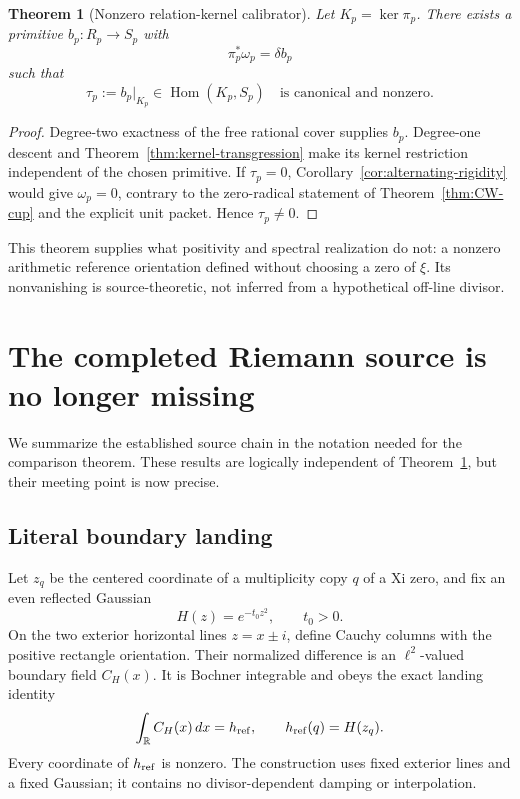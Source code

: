 \documentclass[11pt]{article}
\newtheorem{theorem}{Theorem}[section]
\theoremstyle{definition}
\theoremstyle{remark}
\numberwithin{equation}{section}
\newcommand{\R}{\mathbb R}
\newcommand{\Hom}{\operatorname{Hom}}
\begin{document}
\begin{theorem}[Nonzero relation-kernel calibrator]
\label{thm:calibrator}
Let $K_p=\ker\pi_p$.  There exists a primitive $b_p:R_p\to S_p$ with
\[
       \pi_p^*\omega_p=\delta b_p
\]
such that
\begin{equation}
                \tau_p:=b_p|_{K_p}\in\Hom(K_p,S_p)
                \quad\text{is canonical and nonzero.}
 \label{eq:tau}
\end{equation}
\end{theorem}

\begin{proof}
Degree-two exactness of the free rational cover supplies $b_p$.
Degree-one descent and Theorem~\ref{thm:kernel-transgression} make its
kernel restriction independent of the chosen primitive.  If $\tau_p=0$,
Corollary~\ref{cor:alternating-rigidity} would give $\omega_p=0$, contrary
to the zero-radical statement of Theorem~\ref{thm:CW-cup} and the explicit
unit packet.  Hence $\tau_p\ne0$.
\end{proof}

This theorem supplies what positivity and spectral realization do not: a
nonzero arithmetic reference orientation defined without choosing a zero
of $\xi$.  Its nonvanishing is source-theoretic, not inferred from a
hypothetical off-line divisor.

\section{The completed Riemann source is no longer missing}

We summarize the established source chain in the notation needed for the
comparison theorem.  These results are logically independent of
Theorem~\ref{thm:calibrator}, but their meeting point is now precise.

\subsection{Literal boundary landing}

Let $z_q$ be the centered coordinate of a multiplicity copy $q$ of a Xi
zero, and fix an even reflected Gaussian
\[
                         H(z)=e^{-t_0z^2},\qquad t_0>0.
\]
On the two exterior horizontal lines $z=x\pm i$, define Cauchy columns
with the positive rectangle orientation.  Their normalized difference is
an $\ell^2$-valued boundary field $C_H(x)$.  It is Bochner integrable and
obeys the exact landing identity
\begin{equation}
                         \int_\R C_H(x)\,dx=h_{\rm ref},
              \qquad h_{\rm ref}(q)=H(z_q).
 \label{eq:cauchy-landing}
\end{equation}
Every coordinate of $h_{\rm ref}$ is nonzero.  The construction uses fixed
exterior lines and a fixed Gaussian; it contains no divisor-dependent
damping or interpolation.
\end{document}
